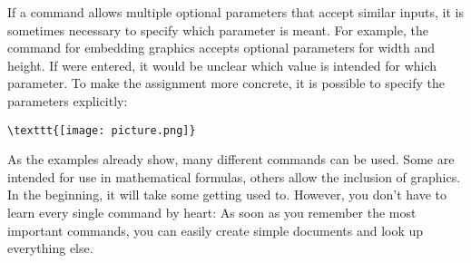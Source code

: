 \begin{table}[h!]
	\caption{Examples for \LaTeX-commands}
	\label{tbl:latex-commands}
\end{table}

If a command allows multiple optional parameters that accept similar inputs, it is sometimes necessary to specify which parameter is meant. 
For example, the command for embedding graphics accepts optional parameters for width and height. 
If \sh{[12cm, 4cm]} were entered, it would be unclear which value is intended for which parameter. 
To make the assignment more concrete, it is possible to specify the parameters explicitly:
\begin{verbatim}
\texttt{[image: picture.png]}
\end{verbatim}

As the examples already show, many different commands can be used. 
Some are intended for use in mathematical formulas, others allow the inclusion of graphics. 
In the beginning, it will take some getting used to. 
However, you don’t have to learn every single command by heart: As soon as you remember the most important commands, you can easily create simple documents and look up everything else.

